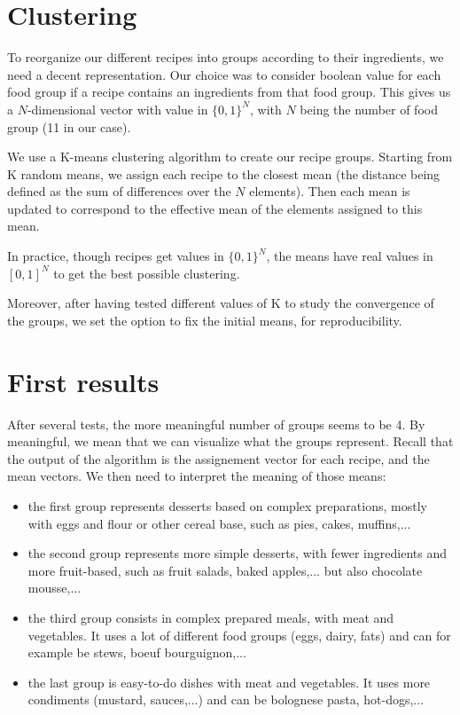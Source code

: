 \documentclass[11pt]{article}
\begin{document}
\section{Clustering}
To reorganize our different recipes into groups according to their ingredients, we need a decent representation. Our choice was to consider boolean value for each food group if a recipe contains an ingredients from that food group. This gives us a $N$-dimensional vector with value in $\{0,1\}^{N}$, with $N$ being the number of food group (11 in our case).

We use a K-means clustering algorithm to create our recipe groups. Starting from K random means, we assign each recipe to the closest mean (the distance being defined as the sum of differences over the $N$ elements). Then each mean is updated to correspond to the effective mean of the elements assigned to this mean.

In practice, though recipes get values in $\{0,1\}^{N}$, the means have real values in $[0,1]^{N}$ to get the best possible clustering.

Moreover, after having tested different values of K to study the convergence of the groups, we set the option to fix the initial means, for reproducibility.

\section{First results}
After several tests, the more meaningful number of groups seems to be 4. By meaningful, we mean that we can visualize what the groups represent. Recall that the output of the algorithm is the assignement vector for each recipe, and the mean vectors. We then need to interpret the meaning of those means:

\begin{itemize}
\item the first group represents desserts based on complex preparations, mostly with eggs and flour or other cereal base, such as pies, cakes, muffins,...
\item the second group represents more simple desserts, with fewer ingredients and more fruit-based, such as fruit salads, baked apples,... but also chocolate mousse,...
\item the third group consists in complex prepared meals, with meat and vegetables. It uses a lot of different food groups (eggs, dairy, fats) and can for example be stews, boeuf bourguignon,...
\item the last group is easy-to-do dishes with meat and vegetables. It uses more condiments (mustard, sauces,...) and can be bolognese pasta, hot-dogs,...
\end{itemize}
\end{document}
